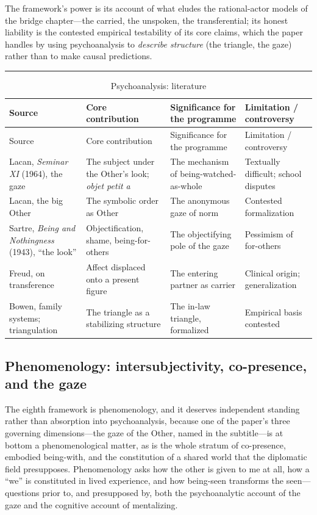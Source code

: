 \documentclass[11pt,a4paper]{article}
\newcommand{\goldrule}{\noindent\textcolor{gold}{\rule{\linewidth}{0.6pt}}\par\vspace{0.4em}}
\begin{document}
The framework's power is its account of what eludes the rational-actor models of the bridge chapter---the carried, the unspoken, the transferential; its honest liability is the contested empirical testability of its core claims, which the paper handles by using psychoanalysis to \emph{describe structure} (the triangle, the gaze) rather than to make causal predictions.

\goldrule
\footnotesize
\begin{longtable}{Y Y Y Y}
\caption{Psychoanalysis: literature}\label{p07:tab:lit-psych}\\
\toprule
{}
Source & Core contribution & Significance for the programme & Limitation / controversy \\
\midrule
\endfirsthead
{}
Source & Core contribution & Significance for the programme & Limitation / controversy \\
\midrule
\endhead
Lacan, \emph{Seminar XI} (1964), the gaze & The subject under the Other's look; \emph{objet petit a} & The mechanism of being-watched-as-whole & Textually difficult; school disputes \\
Lacan, the big Other & The symbolic order as Other & The anonymous gaze of norm & Contested formalization \\
Sartre, \emph{Being and Nothingness} (1943), ``the look'' & Objectification, shame, being-for-others & The objectifying pole of the gaze & Pessimism of for-others \\
Freud, on transference & Affect displaced onto a present figure & The entering partner as carrier & Clinical origin; generalization \\
Bowen, family systems; triangulation & The triangle as a stabilizing structure & The in-law triangle, formalized & Empirical basis contested \\
\bottomrule
\end{longtable}

\subsection{Phenomenology: intersubjectivity, co-presence, and the gaze}
The eighth framework is phenomenology, and it deserves independent standing rather than absorption into psychoanalysis, because one of the paper's three governing dimensions---the gaze of the Other, named in the subtitle---is at bottom a phenomenological matter, as is the whole stratum of co-presence, embodied being-with, and the constitution of a shared world that the diplomatic field presupposes. Phenomenology asks how the other is given to me at all, how a ``we'' is constituted in lived experience, and how being-seen transforms the seen---questions prior to, and presupposed by, both the psychoanalytic account of the gaze and the cognitive account of mentalizing.
\end{document}
